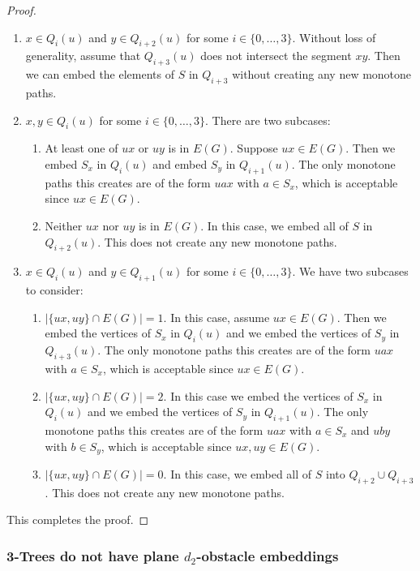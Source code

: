 \documentclass{patmorin}
\begin{document}
\begin{proof}
\begin{enumerate}
  \item  $x\in Q_i(u)$ and $y\in Q_{i+2}(u)$ for some
  $i\in\{0,\ldots,3\}$. Without loss of generality, assume that
  $Q_{i+3}(u)$ does not intersect the segment $xy$. Then we can embed the
  elements of $S$ in $Q_{i+3}$ without creating any new monotone paths.

  \item $x,y\in Q_i(u)$ for some $i\in\{0,\ldots,3\}$. There are two
  subcases:
    \begin{enumerate}
      \item At least one of $ux$ or $uy$ is in $E(G)$. Suppose $ux\in E(G)$.
      Then we embed $S_x$ in $Q_i(u)$ and embed $S_y$ in $Q_{i+1}(u)$.
      The only monotone paths this creates are of the form $uax$ with
      $a\in S_x$, which is acceptable since $ux\in E(G)$.
      \item Neither $ux$ nor $uy$ is in $E(G)$. In this case, we embed all
    of $S$ in $Q_{i+2}(u)$.  This does not create any new monotone paths.
    \end{enumerate}

  \item $x\in Q_i(u)$ and $y\in Q_{i+1}(u)$ for some $i\in\{0,\ldots,3\}$.
  We have two subcases to consider:
    \begin{enumerate}
      \item $|\{ux,uy\}\cap E(G)|=1$.  In this case, assume $ux\in
      E(G)$. Then we embed the vertices of $S_x$ in $Q_i(u)$ and we
      embed the vertices of $S_y$ in $Q_{i+3}(u)$.  The only monotone
      paths this creates are of the form $uax$ with $a\in S_x$, which
      is acceptable since $ux\in E(G)$.
      \item $|\{ux,uy\}\cap E(G)|=2$.  In this case we embed the
      vertices of $S_x$ in $Q_i(u)$ and we embed the vertices of $S_y$
      in $Q_{i+1}(u)$.  The only monotone paths this creates are of the
      form $uax$ with $a\in S_x$ and $uby$ with $b\in S_y$, which is
      acceptable since $ux,uy\in E(G)$.
      \item $|\{ux,uy\}\cap E(G)|=0$.  In this case, we embed all of
      $S$ into $Q_{i+2}\cup Q_{i+3}$.  This does not create any new
      monotone paths.
    \end{enumerate}
  \end{enumerate}
This completes the proof.
\end{proof}

\subsubsection{3-Trees do not have plane $d_2$-obstacle embeddings}
\end{document}
